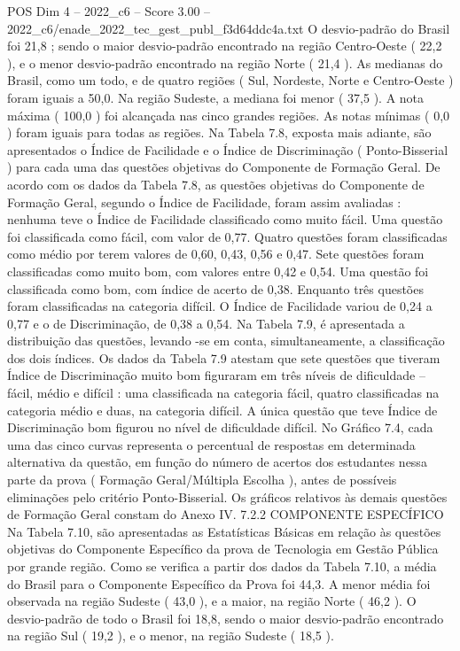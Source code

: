 \begin{textsample}{POS Dim 4 – 2022\_c6 – Score 3.00 – 2022\_c6/enade\_2022\_tec\_gest\_publ\_f3d64ddc4a.txt}
O desvio-padrão do Brasil foi 21,8 ; sendo o maior desvio-padrão encontrado na região Centro-Oeste ( 22,2 ), e o menor desvio-padrão encontrado na região Norte ( 21,4 ).
As medianas do Brasil, como um todo, e de quatro regiões ( Sul, Nordeste, Norte e Centro-Oeste ) foram iguais a 50,0.
Na região Sudeste, a mediana foi menor ( 37,5 ).
A nota máxima ( 100,0 ) foi alcançada nas cinco grandes regiões.
As notas mínimas ( 0,0 ) foram iguais para todas as regiões.
Na Tabela 7.8, exposta mais adiante, são apresentados o Índice de Facilidade e o Índice de Discriminação ( Ponto-Bisserial ) para cada uma das questões objetivas do Componente de Formação Geral.
De acordo com os dados da Tabela 7.8, as questões objetivas do Componente de Formação Geral, segundo o Índice de Facilidade, foram assim avaliadas : nenhuma teve o Índice de Facilidade classificado como muito fácil.
Uma questão foi classificada como fácil, com valor de 0,77.
Quatro questões foram classificadas como médio por terem valores de 0,60, 0,43, 0,56 e 0,47.
Sete questões foram classificadas como muito bom, com valores entre 0,42 e 0,54.
Uma questão foi classificada como bom, com índice de acerto de 0,38.
Enquanto três questões foram classificadas na categoria difícil.
O Índice de Facilidade variou de 0,24 a 0,77 e o de Discriminação, de 0,38 a 0,54.
Na Tabela 7.9, é apresentada a distribuição das questões, levando -se em conta, simultaneamente, a classificação dos dois índices.
Os dados da Tabela 7.9 atestam que sete questões que tiveram Índice de Discriminação muito bom figuraram em três níveis de dificuldade – fácil, médio e difícil : uma classificada na categoria fácil, quatro classificadas na categoria médio e duas, na categoria difícil.
A única questão que teve Índice de Discriminação bom figurou no nível de dificuldade difícil.
No Gráfico 7.4, cada uma das cinco curvas representa o percentual de respostas em determinada alternativa da questão, em função do número de acertos dos estudantes nessa parte da prova ( Formação Geral/Múltipla Escolha ), antes de possíveis eliminações pelo critério Ponto-Bisserial.
Os gráficos relativos às demais questões de Formação Geral constam do Anexo IV. 7.2.2 COMPONENTE ESPECÍFICO Na Tabela 7.10, são apresentadas as Estatísticas Básicas em relação às questões objetivas do Componente Específico da prova de Tecnologia em Gestão Pública por grande região.
Como se verifica a partir dos dados da Tabela 7.10, a média do Brasil para o Componente Específico da Prova foi 44,3.
A menor média foi observada na região Sudeste ( 43,0 ), e a maior, na região Norte ( 46,2 ).
O desvio-padrão de todo o Brasil foi 18,8, sendo o maior desvio-padrão encontrado na região Sul ( 19,2 ), e o menor, na região Sudeste ( 18,5 ).

\end{textsample}
